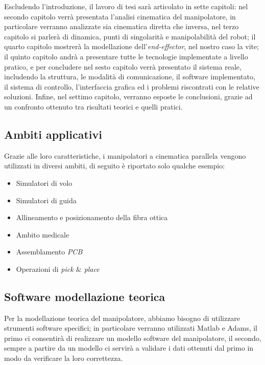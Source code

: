 Escludendo l'introduzione, il lavoro di tesi sarà articolato in sette capitoli: nel secondo capitolo verrà presentata l'analisi cinematica del manipolatore, in particolare verranno analizzate sia cinematica diretta che inversa, nel terzo capitolo si parlerà di dinamica, punti di singolarità e manipolabilità del robot; il quarto capitolo mostrerà la modellazione dell'\textit{end-effector}, nel nostro caso la vite; il quinto capitolo andrà a presentare tutte le tecnologie implementate a livello pratico, e per concludere nel sesto capitolo verrà presentato il sistema reale, includendo la struttura, le modalità di comunicazione, il software implementato, il sistema di controllo, l'interfaccia grafica ed i problemi riscontrati con le relative soluzioni. Infine, nel settimo capitolo, verranno esposte le conclusioni, grazie ad un confronto ottenuto tra risultati teorici e quelli pratici.
\subsection{Ambiti applicativi}
Grazie alle loro caratteristiche, i manipolatori a cinematica parallela vengono utilizzati in diversi ambiti, di seguito è riportato solo qualche esempio:
\begin{itemize}
	\item Simulatori di volo
	\item Simulatori di guida
	\item Allineamento e posizionamento della fibra ottica
	\item Ambito medicale
	\item Assemblamento \textit{PCB}
	\item Operazioni di \textit{pick $\&$ place}
\end{itemize}

\subsection{Software modellazione teorica}
Per la modellazione teorica del manipolatore, abbiamo bisogno di utilizzare strumenti software specifici; in particolare verranno utilizzati Matlab e Adams, il primo ci consentirà di realizzare un modello software del manipolatore, il secondo, sempre a partire da un modello ci servirà a validare i dati ottenuti dal primo in modo da verificare la loro correttezza.
